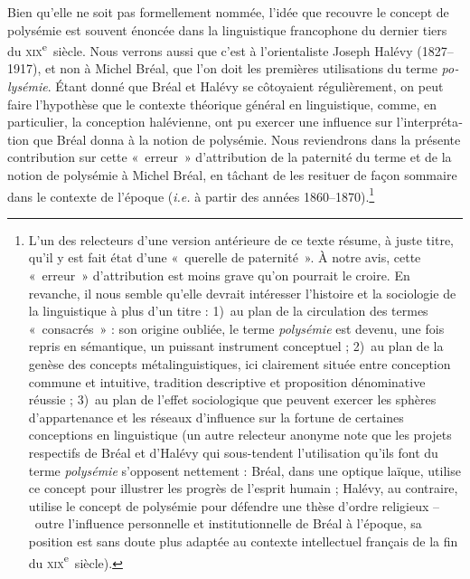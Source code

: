 \documentclass[output=paper]{langsci/langscibook}
\begin{document}
\begin{otherlanguage}{french}
Bien qu’elle ne soit pas formellement nommée, l’idée que recouvre le concept de polysémie est souvent énoncée dans la linguistique francophone du dernier tiers du \textsc{xix}\textsuperscript{e}~siècle. Nous verrons aussi que c’est à l’orientaliste Joseph Halévy (1827--1917), et non à Michel Bréal, que l’on doit les premières utilisations du terme \textit{polysémie}. Étant donné que Bréal et Halévy se côtoyaient régulièrement, on peut faire l’hypothèse que le contexte théorique général en linguistique, comme, en particulier, la conception halévienne, ont pu exercer une influence sur l’interprétation que Bréal donna à la notion de polysémie. Nous reviendrons dans la présente contribution sur cette «~erreur~» d’attribution de la paternité du terme et de la notion de polysémie à Michel Bréal, en tâchant de les resituer de façon sommaire dans le contexte de l’époque (\textit{i.e.} à partir des années 1860--1870).\footnote{L’un des relecteurs d’une version antérieure de ce texte résume, à juste titre, qu’il y est fait état d’une «~querelle de paternité~». À notre avis, cette «~erreur~» d’attribution est moins grave qu’on pourrait le croire. En revanche, il nous semble qu’elle devrait intéresser l’histoire et la sociologie de la linguistique à plus d’un titre : 1)~au plan de la circulation des termes «~consacrés~» : son origine oubliée, le terme \textrm{\textit{polysémie}} \textrm{est devenu, une fois repris en sémantique, un puissant instrument conceptuel ; 2)~au plan de la genèse des concepts métalinguistiques, ici clairement située entre conception commune et intuitive, tradition descriptive et proposition dénominative réussie ; 3)~au plan de l’effet sociologique que peuvent exercer les sphères d’appartenance et les réseaux d’influence sur la fortune de certaines conceptions en linguistique (un autre relecteur anonyme note que les projets respectifs de Bréal et d’Halévy qui sous-tendent l’utilisation qu’ils font du terme} \textrm{\textit{polysémie}} \textrm{s’opposent nettement : Bréal, dans une optique laïque, utilise ce concept pour illustrer les progrès de l’esprit humain ; Halévy, au contraire, utilise le concept de polysémie pour défendre une thèse d’ordre religieux –~outre l’influence personnelle et institutionnelle de Bréal à l’époque, sa position est sans doute plus adaptée au contexte intellectuel français de la fin du} \textrm{\textsc{xix}}\textrm{\textsuperscript{e}}~siècle).}
 

\end{otherlanguage}
\end{document}
